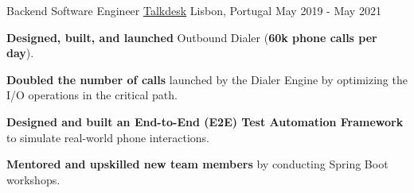 \begin{cventries}

  \cventry
    {Backend Software Engineer}
    {\href{https://www.talkdesk.com/}{Talkdesk}}
    {Lisbon, Portugal}
    {May 2019 - May 2021}
    {
      \begin{cvitems}
        \item \textbf{Designed, built, and launched} Outbound Dialer (\textbf{60k phone calls per day}).
        \item \textbf{Doubled the number of calls} launched by the Dialer Engine by optimizing the I/O operations in the critical path.
        \item \textbf{Designed and built an End-to-End (E2E) Test Automation Framework} to simulate real-world phone interactions.
        \item \textbf{Mentored and upskilled new team members} by conducting Spring Boot workshops.
      \end{cvitems}
      \vspace{4mm}
    }

    

\end{cventries}

